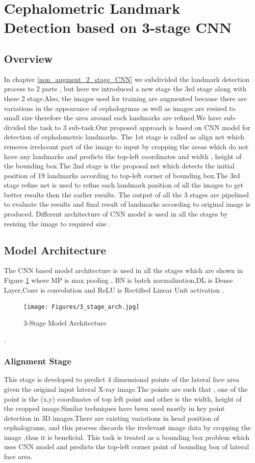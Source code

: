 \documentclass[sn-mathphys]{sn-jnl}%
\theoremstyle{thmstyleone}%
\theoremstyle{thmstyletwo}%
\theoremstyle{thmstylethree}%
\begin{document}
\section{Cephalometric Landmark Detection based on 3-stage CNN}\label{3_stage_CNN}
\subsection{Overview}
In chapter \ref{non_augment_2_stage_CNN} we  subdivided the landmark detection process to 2 parts , but here we introduced a new stage the 3rd stage along with these 2 stage.Also, the images used for training are augmented because there are variations in the appearance of cephalogrmas as well as images are resized to small size   therefore the area around each landmarks are refined.We have sub-divided the task to 3 sub-task.Our proposed approach is based on CNN model for detection of cephalometric landmarks. The 1st stage is called as align net which removes irrelavant part of the image to input by cropping the areas which do not have any landmarks and predicts the top-left coordinates and width , height of the bounding box.The 2nd stage is the proposal net which detects the initial position of 19 landmarks according to top-left corner of bounding box.The 3rd stage refine net is used to refine each landmark position of all the images to get better results then the earlier results. The output of all the 3 stages are pipelined to evaluate the results and final result of landmarks according to original image is produced. Different architecture of CNN model is used in all the stages by resizing the image to required size .

\subsection{Model Architecture}
The  CNN based model architecture is used in all the stages which are shown in Figure \ref{figure 6.1:3_stage_arch} where MP is max pooling , BN is batch normalization,DL is Dense Layer,Conv is convolution and  ReLU is Rectified Linear Unit activation .

\begin{figure}[htp]
    \centering
    \texttt{[image: Figures/3\_stage\_arch.jpg]}
    \caption{3-Stage Model Architecture}
    \label{figure 6.1:3_stage_arch}
\end{figure}.

 \subsubsection{Alignment Stage}
 This stage is developed to predict 4 dimensional points  of the lateral face area given the original input lateral X-ray image.The  points are such that , one of the point is the (x,y) coordinates of top left point and other is the width, height  of the cropped image.Similar techniques have been used mostly in key point detection in 3D images.There are  existing variations in head position  of cephalograms, and this process discards the irrelevant image data by cropping the image ,thus it is beneficial. This task  is treated as a bounding box problem which uses CNN model and predicts the top-left corner point of bounding box of lateral face area.
\end{document}
